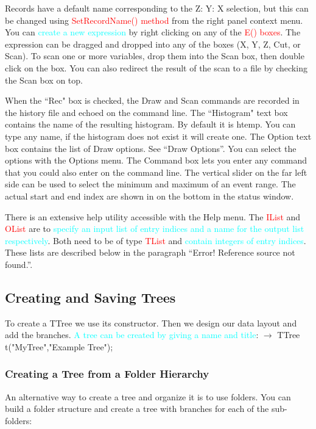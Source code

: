 \documentclass[12pt,a4paper]{article}
\begin{document}
Records have a default name corresponding to the Z: Y: X selection, but this can be changed using \textcolor{red}{SetRecordName() method} from the right panel context menu. You can \textcolor{cyan}{create a new expression} by right clicking on any of the \textcolor{red}{E() boxes}. The expression can be dragged and dropped into any of the boxes (X, Y, Z, Cut, or Scan). To scan one or more variables, drop them into the Scan box, then double click on the box. You can also redirect the result of the scan to a file by checking the Scan box on top.

When the ``Rec" box is checked, the Draw and Scan commands are recorded in the history file and echoed on the
command line. The ``Histogram" text box contains the name of the resulting histogram. By default it is htemp. You
can type any name, if the histogram does not exist it will create one. The Option text box contains the list of Draw
options. See ``Draw Options”. You can select the options with the Options menu. The Command box lets you enter
any command that you could also enter on the command line. The vertical slider on the far left side can be used to
select the minimum and maximum of an event range. The actual start and end index are shown in on the bottom in
the status window.

There is an extensive help utility accessible with the Help menu. The \textcolor{red}{IList} and \textcolor{red}{OList} are to \textcolor{cyan}{specify an input list of entry indices and a name for the output list respectively}. Both need to be of type \textcolor{red}{TList} and \textcolor{cyan}{contain integers of entry indices}. These lists are described below in the paragraph ``Error! Reference source not found.”.

\subsection{Creating and Saving Trees}
To create a TTree we use its constructor. Then we design our data layout and add the branches. \textcolor{cyan}{A tree can be created by giving a name and title}:
$\rightarrow$
TTree t("MyTree","Example Tree");

\subsubsection{Creating a Tree from a Folder Hierarchy}
An alternative way to create a tree and organize it is to use folders. You can build a folder structure and create a tree with branches for each of the sub-folders:
\end{document}
